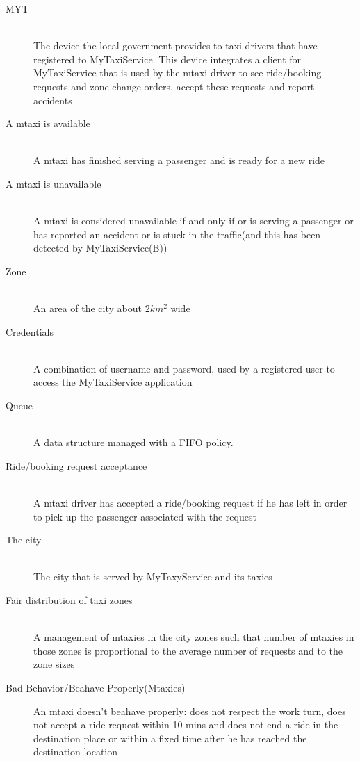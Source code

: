\documentclass[11pt,titlepage]{article} %
\begin{document}
\begin{description}
	      \item [MYT] \hfill \\The device the local government provides to taxi drivers that have registered to MyTaxiService. This
	      device integrates a client for MyTaxiService that is used by the mtaxi driver to see ride/booking requests and zone change orders, accept
	      these requests and report accidents
	      \item [A mtaxi is available] \hfill \\ A mtaxi has finished serving a passenger and is ready for a new ride
	      \item [A mtaxi is unavailable]\hfill \\ A mtaxi is considered unavailable if and only if or is serving a passenger or has reported an accident or
	      is stuck in the traffic(and this has been detected by \newline MyTaxiService(B))
	      \item [Zone] \hfill \\An area of the city about $2km^2$ wide
	      \item [Credentials] \hfill \\ A combination of username and password, used by a registered user to access the MyTaxiService application
	      \item [Queue] \hfill \\ A data structure managed with a FIFO policy.
	      \item [Ride/booking request acceptance] \hfill \\ A mtaxi driver has accepted a ride/booking request if he has left in order to pick up the passenger
	      associated with the request
	      \item [The city] \hfill \\The city that is served by MyTaxyService and its taxies
	     \item [Fair distribution of taxi zones] \hfill \\ A management of  mtaxies in the city zones such that number of mtaxies in those zones is proportional to the average number of requests and to the zone sizes
	     \item [Bad Behavior/Beahave Properly(Mtaxies)] An mtaxi doesn't beahave properly: does not respect the work turn, does not accept a ride request within 10 mins and does not end a ride in the destination place or within a fixed time after he has reached the destination location
	\end{description}
\end{document}

